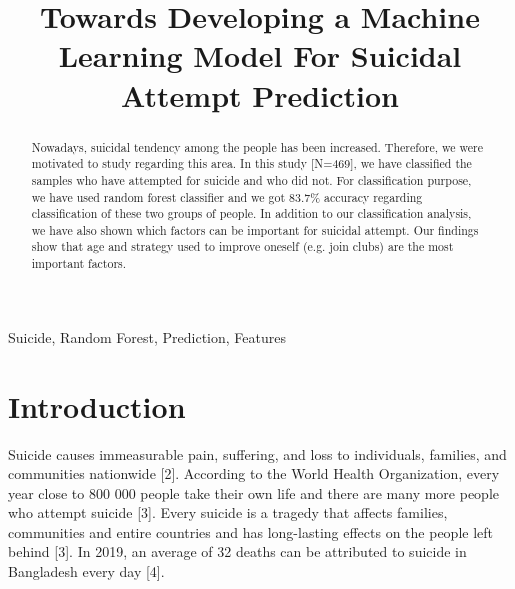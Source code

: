 \documentclass[conference]{IEEEtran}
\begin{document}
\title{Towards Developing a Machine Learning Model For Suicidal Attempt Prediction}

\author{
\and
{}
\and
{}
}

\maketitle

\begin{abstract}
Nowadays, suicidal tendency among the people has been increased. Therefore, we were motivated to study regarding this area. In this study [N=469], we have classified the samples who have attempted for suicide and who did not. For classification purpose, we have used random forest classifier and we got 83.7\% accuracy regarding classification of these two groups of people. In addition to our classification analysis, we have also shown which factors can be important for suicidal attempt. Our findings show that age and strategy used to improve oneself (e.g.  join clubs) are the most important factors.
\end{abstract}

\begin{IEEEkeywords}
Suicide, Random Forest, Prediction, Features
\end{IEEEkeywords}

\section{Introduction}
    Suicide causes immeasurable pain, suffering, and loss to individuals, families, and communities nationwide [2]. According to the World Health Organization, every year close to 800 000 people take their own life and there are many more people who attempt suicide [3]. Every suicide is a tragedy that affects families, communities and entire countries and has long-lasting effects on the people left behind [3]. In 2019, an average of 32 deaths can be attributed to suicide in Bangladesh every day [4].
\end{document}

